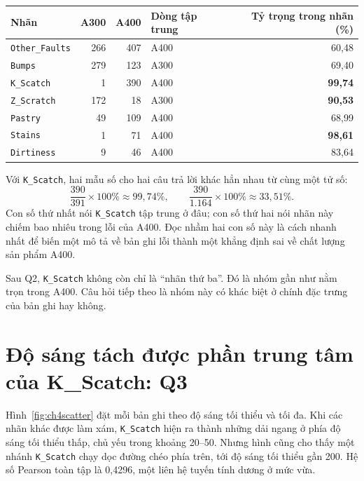 \documentclass[12pt,a4paper,oneside]{report}
\newcommand{\maCot}[1]{{\urlstyle{tt}\def\UrlBreaks{\do\_\do\/\do\.}\def\UrlBigBreaks{}\nolinkurl{#1}}}
\begin{document}
\begin{center}\begin{minipage}{\linewidth}
\label{tab:ch4taptrung}
\small{}
\begin{tabularx}{\linewidth}{@{}Y rr p{2.0cm}r@{}}
\toprule
Nhãn & A300 & A400 & Dòng tập trung & Tỷ trọng trong nhãn (\%) \\
\midrule
\maCot{Other_Faults} & 266 & 407 & A400 & 60,48 \\
\maCot{Bumps} & 279 & 123 & A300 & 69,40 \\
\maCot{K_Scatch} & 1 & 390 & A400 & \textbf{99,74} \\
\maCot{Z_Scratch} & 172 & 18 & A300 & \textbf{90,53} \\
\maCot{Pastry} & 49 & 109 & A400 & 68,99 \\
\maCot{Stains} & 1 & 71 & A400 & \textbf{98,61} \\
\maCot{Dirtiness} & 9 & 46 & A400 & 83,64 \\
\bottomrule
\end{tabularx}
\end{minipage}\end{center}

Với \maCot{K_Scatch}, hai mẫu số cho hai câu trả lời khác hẳn nhau từ cùng một tử số:
\begin{equation}
\frac{390}{391}\times100\%\approx99{,}74\%,
\qquad
\frac{390}{1.164}\times100\%\approx33{,}51\%.
\label{eq:ch4mauso}
\end{equation}
Con số thứ nhất nói \maCot{K_Scatch} tập trung ở đâu; con số thứ hai nói nhãn này chiếm bao nhiêu trong lỗi của A400. Đọc nhầm hai con số này là cách nhanh nhất để biến một mô tả về bản ghi lỗi thành một khẳng định sai về chất lượng sản phẩm A400.

Sau Q2, \maCot{K_Scatch} không còn chỉ là ``nhãn thứ ba''. Đó là nhóm gần như nằm trọn trong A400. Câu hỏi tiếp theo là nhóm này có khác biệt ở chính đặc trưng của bản ghi hay không.

\section{Độ sáng tách được phần trung tâm của K\_Scatch: Q3}
\label{sec:ch4q3}

Hình~\ref{fig:ch4scatter} đặt mỗi bản ghi theo độ sáng tối thiểu và tối đa. Khi các nhãn khác được làm xám, \maCot{K_Scatch} hiện ra thành những dải ngang ở phía độ sáng tối thiểu thấp, chủ yếu trong khoảng 20--50. Nhưng hình cũng cho thấy một nhánh \maCot{K_Scatch} chạy dọc đường chéo phía trên, tới độ sáng tối thiểu gần 200. Hệ số Pearson toàn tập là 0,4296, một liên hệ tuyến tính dương ở mức vừa.
\end{document}
